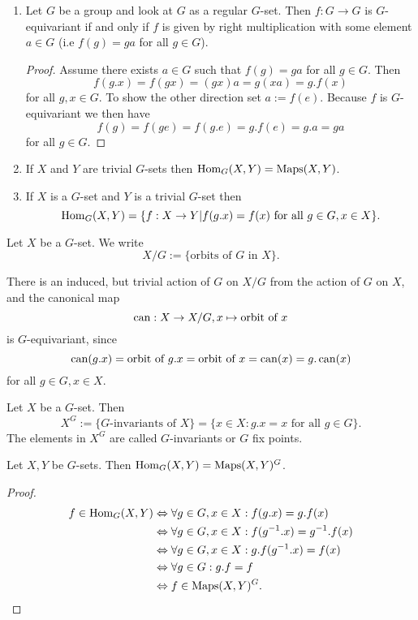 \begin{expls}
 \begin{enumerate}
  \item
   Let $G$ be a group and look at $G$ as a regular $G$-set. Then $f : G \to G$ is $G$-equivariant if and only if $f$ is given by right multiplication with some element $a \in G$ (i.e $f(g) = ga$ for all $g \in G$).
   \begin{proof}
    Assume there exists $a \in G$ such that $f(g) = ga$ for all $g \in G$. Then
    \[
     f(g.x) = f(gx) = (gx)a = g(xa) = g.f(x)
    \]
    for all $g, x \in G$. To show the other direction set $a := f(e)$. Because $f$ is $G$-equivariant we then have
    \[
     f(g) = f(ge) = f(g.e) = g.f(e) = g.a = ga
    \]
    for all $g \in G$.
   \end{proof}
  \item
   If $X$ and $Y$ are trivial $G$-sets then $\operatorname{Hom}_G(X,Y) = \operatorname{Maps}(X,Y)$.
  \item
   If $X$ is a $G$-set and $Y$ is a trivial $G$-set then
   \[
    \operatorname{Hom}_G(X,Y) = \{f : X \to Y | f(g.x) = f(x) \text{ for all } g \in G, x \in X\}.
   \]
 \end{enumerate}
\end{expls}


\begin{defi}
 Let $X$ be a $G$-set. We write
 \[
  X/G := \{\text{orbits of $G$ in $X$}\}.
 \]
\end{defi}


\begin{note}
 There is an induced, but trivial action of $G$ on $X/G$ from the action of $G$ on $X$, and the canonical map
 \[
  \operatorname{can} : X \to X/G, x \mapsto \text{orbit of } x
 \]
 is $G$-equivariant, since
 \[
  \operatorname{can}(g.x) = \text{orbit of $g.x$} = \text{orbit of $x$} = \operatorname{can}(x) = g.\operatorname{can}(x)
 \]
 for all $g \in G, x \in X$.
\end{note}


\begin{defi}
 Let $X$ be a $G$-set. Then
 \[
  X^G := \{\text{$G$-invariants of $X$}\} = \{x \in X : g.x = x \text{ for all } g \in G\}.
 \]
 The elements in $X^G$ are called $G$-invariants or $G$ fix points.
\end{defi}


\begin{lem}
 Let $X, Y$ be $G$-sets. Then $\operatorname{Hom}_G(X,Y) = \operatorname{Maps}(X,Y)^G$.
\end{lem}
\begin{proof}
 \begin{align*}
  f \in \operatorname{Hom}_G(X,Y)
  &\Leftrightarrow \forall g \in G, x \in X : f(g.x) = g.f(x) \\
  &\Leftrightarrow \forall g \in G, x \in X : f(g^{-1}.x) = g^{-1}.f(x) \\
  &\Leftrightarrow \forall g \in G, x \in X : g.f(g^{-1}.x) = f(x) \\
  &\Leftrightarrow \forall g \in G : g.f = f \\
  &\Leftrightarrow f \in \operatorname{Maps}(X,Y)^G.
 \end{align*}
\end{proof}


